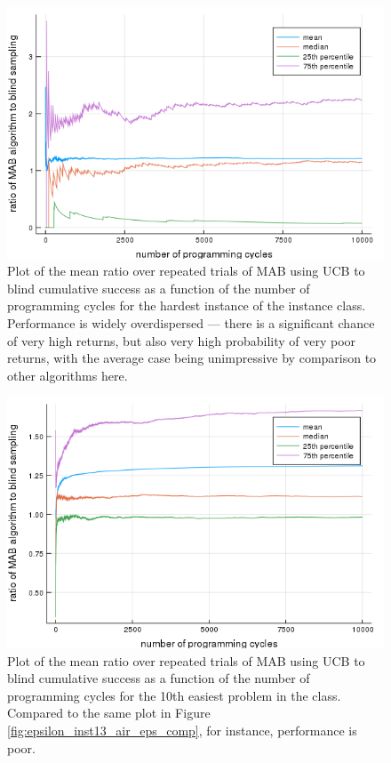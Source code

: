 \begin{figure}
    \includegraphics[width=0.8\columnwidth]{ucb_inst3_air.png}
    \caption{Plot of the mean ratio over repeated trials of MAB using UCB to blind cumulative success as a function of the number of programming cycles for the hardest instance of the instance class. Performance is widely overdispersed --- there is a significant chance of very high returns, but also very high probability of very poor returns, with the average case being unimpressive by comparison to other algorithms here.}
    \label{fig:boltzmann_inst3_air}
\end{figure}

\begin{figure}
    \includegraphics[width=0.8\columnwidth]{ucb_inst13_air.png}
    \caption{Plot of the mean ratio over repeated trials of MAB using UCB to blind cumulative success as a function of the number of programming cycles for the 10th easiest problem in the class. Compared to the same plot in Figure \ref{fig:epsilon_inst13_air_eps_comp}, for instance, performance is poor.}
    \label{fig:ucb_inst13_air}
\end{figure}


